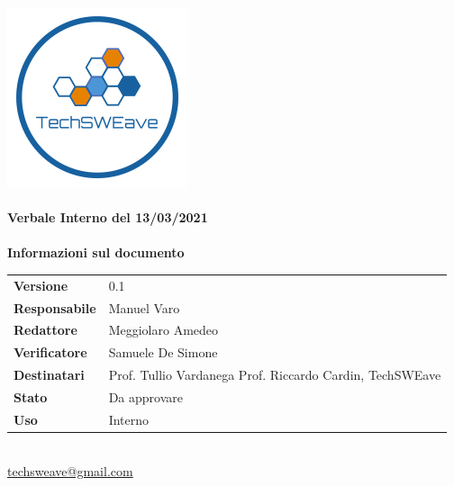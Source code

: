 \documentclass[a4paper]{article}
\begin{document}
        
    \begin{titlepage}
        \begin{center}
            \includegraphics{../../../../Images/logo.png}\\
            \vspace{20px}
            \textcolor{logo}{\hrulefill}\\
            \vspace{20px}
            \textbf{\huge\textcolor{logo}{Verbale Interno del 13/03/2021}}\\
            \vspace{10px}
            \textcolor{logo}{\hrulefill}\\
            \vspace{40px}
            \textbf{\Large Informazioni sul documento}\\
            \vspace{20px}
            \begin{tabular}{p{100px} | p{100px}}
                \textbf{Versione} & 0.1\\
                \textbf{Responsabile} & Manuel Varo\\
                \textbf{Redattore} & Meggiolaro Amedeo\\
                \textbf{Verificatore} & Samuele De Simone\\
                \textbf{Destinatari} & Prof. Tullio Vardanega \newline Prof. Riccardo Cardin, \newline TechSWEave\\
                \textbf{Stato} & Da approvare\\
                \textbf{Uso} & Interno\\
            \end{tabular}\\
            \vspace{60px}
            \href{mailto:techsweave@gmail.com}{techsweave@gmail.com}\\
    
        \end{center}
        \end{titlepage}
    
\end{document}
